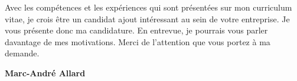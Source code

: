 \vfill
Avec les compétences et les expériences qui sont présentées sur mon curriculum
vitae, je crois être un candidat ajout intéressant au sein de votre
entreprise. Je vous présente donc ma candidature. En entrevue, je
pourrais vous parler davantage de mes motivations.
\vfill
Merci de l'attention que vous portez à ma demande.
\vfill
\begin{flushright}
{\bfseries Marc-André Allard}\\
\end{flushright}
\vfill

